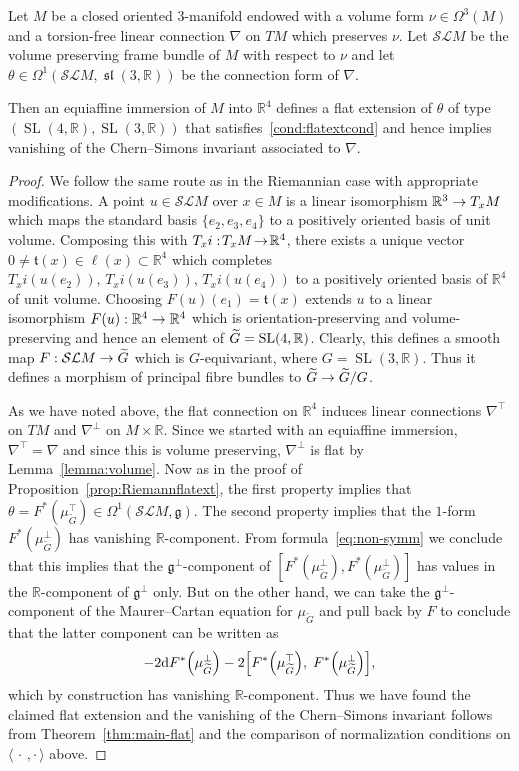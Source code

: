 \documentclass[AHL,Unicode,longabstracts]{cedram}
\newcommand{\x}{\times}
\newcommand{\Om}{\Omega}
\newcommand{\B}[2]{\langle#1,#2\rangle}
\DeclareMathOperator{\SL}{SL}
\DeclareMathOperator{\fksl}{\mathfrak{sl}}
\renewcommand*{\d}{\mathrm{d}}
\newcommand*{\R}{\mathbb{R}}
\newcommand{\fkg}{\mathfrak{g}}
\newcommand{\fkt}{\mathfrak{t}}
\newcommand{\clSL}{\mathcal{SL}}
\renewcommand*{\to}{\mathchoice{\longrightarrow}{\rightarrow}{\rightarrow}{\rightarrow}}
\let\originalleft\left
\let\originalright\right
\renewcommand{\left}{\mathopen{}\mathclose\bgroup\originalleft}
\renewcommand{\right}{\aftergroup\egroup\originalright}
\let\oldtilde\tilde
\renewcommand*{\tilde}[1]{\mathchoice{\widetilde{#1}}{\widetilde{#1}}{\oldtilde{#1}}{\oldtilde{#1}}}
\newcommand*{\R}{\mathbb{R}}
\begin{document}
\begin{theo}\label{thm:equiaffine}
Let $M$ be a closed oriented $3$-manifold endowed with a volume form $\nu\in\Om^3(M)$ and a torsion-free linear connection $\nabla$ on $TM$ which preserves $\nu$. Let $\clSL M$ be the volume preserving frame bundle of $M$ with respect to $\nu$ and let $\theta\in\Om^1(\clSL M,\fksl(3,\R))$ be the connection form of $\nabla$.

Then an equiaffine immersion of $M$ into $\R^4$ defines a flat extension of $\theta$ of type $(\SL(4,\R),\SL(3,\R))$ that satisfies~\eqref{cond:flatextcond} and hence implies vanishing of the Chern--Simons invariant associated to $\nabla$.
\end{theo}

\begin{proof}
We follow the same route as in the Riemannian case with appropriate modifications. A point $u\in \clSL M$ over $x\in M$ is a linear isomorphism $\R^3\to T_xM$ which maps the standard basis $\{e_2,e_3,e_4\}$ to a positively oriented basis of unit volume. Composing this with $T_xi :\! T_xM\!\to\!\R^4$, there exists a unique vector $0 \neq\! \fkt(x)\! \in \ell(x)\! \subset  \R^4$ which completes $T_xi(u(e_2)),\,T_xi(u(e_3)),\,T_xi(u(e_4))$ to a positively oriented basis of $\R^4$ of unit volume. Choosing $F(u)(e_1)=\fkt(x)$ extends $u$ to a linear isomorphism $F(u):\R^4\to\R^4$ which is orientation-preserving and volume-preserving and hence an element of $\tilde G=\SL(4,\R)$. Clearly, this defines a smooth map $F:\clSL M\to \tilde G$ which is $G$-equivariant, where $G=\SL(3,\R)$. Thus it defines a morphism of principal fibre bundles to $\tilde G\to \tilde G/G$.

As we have noted above, the flat connection on $\R^4$ induces linear connections $\nabla^\top$ on $TM$ and $\nabla^\perp$ on $M\x\R$. Since we started with an equiaffine immersion, $\nabla^\top=\nabla$ and since this is volume preserving, $\nabla^\perp$ is flat by Lemma~\ref{lemma:volume}. Now as in the proof of Proposition~\ref{prop:Riemannflatext}, the first property implies that $\theta=F^*(\mu_{\widetilde G}^\top)\in\Om^1(\clSL M,\fkg)$. The second property implies that the $1$-form $F^*(\mu_{\widetilde G}^\perp)$ has vanishing $\R$-component. From formula~\eqref{eq:non-symm} we conclude that this implies that the $\fkg^\perp$-component of $[F^*(\mu_{\widetilde G}^\perp),F^*(\mu_{\widetilde G}^\perp)]$ has values in the $\R$-component of $\fkg^\perp$ only. But on the other hand, we can take the $\fkg^\perp$-component of the Maurer--Cartan equation for $\mu_{\widetilde G}$ and pull back by $F$ to conclude that the latter component can be written as
\[
-2\d F^*\left(\mu_{\widetilde G}^\perp\right)-2\left[F^*\left(\mu_{\widetilde G}^\top\right),\; F^*\left(\mu_{\widetilde G}^\perp\right)\right],
\]
which by construction has vanishing $\R$-component. Thus we have found the claimed flat extension and the vanishing of the Chern--Simons invariant follows from Theorem~\ref{thm:main-flat} and the comparison of normalization conditions on $\B{\,\cdot\,}{\cdot\,}$ above.
\end{proof}
\end{document}
